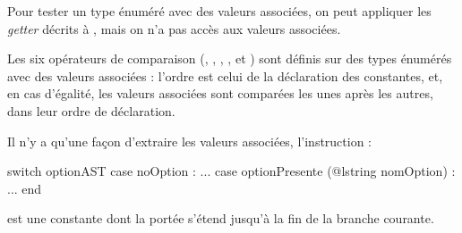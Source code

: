 Pour tester un type énuméré avec des valeurs associées, on peut appliquer les \emph{getter} décrits à , mais on n'a pas accès aux valeurs associées.

Les six opérateurs de comparaison (\galgas{==}, \galgas{\!=}, \galgas{<}, \galgas{<=}, \galgas{>} et \galgas{>}) sont définis sur des types énumérés avec des valeurs associées : l'ordre est celui de la déclaration des constantes, et, en cas d'égalité, les valeurs associées sont comparées les unes après les autres, dans leur ordre de déclaration.

Il n'y a qu'une façon d'extraire les valeurs associées, l'instruction  :

\begin{galgascode}
switch optionAST
case noOption : ...
case optionPresente (@lstring nomOption) : ...
end
\end{galgascode}

 est une constante dont la portée s'étend jusqu'à la fin de la branche  courante.
 
